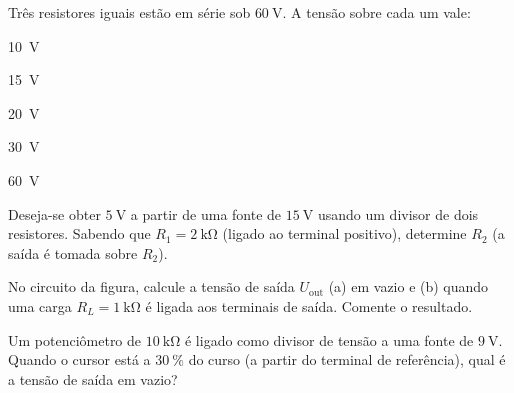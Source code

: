 \begin{questao}[1]{}

Três resistores iguais estão em série sob $\SI{60}{\volt}$. A tensão sobre cada um
vale:
\begin{alternativas}[3]
\item \SI{10}{\volt}
\item \SI{15}{\volt}
\item \SI{20}{\volt}
\item \SI{30}{\volt}
\item \SI{60}{\volt}
\end{alternativas}


\end{questao}

\blocoaplicacao
\begin{questao}[2]{}

Deseja-se obter $\SI{5}{\volt}$ a partir de uma fonte de $\SI{15}{\volt}$ usando
um divisor de dois resistores. Sabendo que $R_1 = \SI{2}{\kilo\ohm}$ (ligado ao
terminal positivo), determine $R_2$ (a saída é tomada sobre $R_2$).


\end{questao}
\begin{questao}[2]{}

No circuito da figura, calcule a tensão de saída $U_{\text{out}}$ (a) em vazio e
(b) quando uma carga $R_L = \SI{1}{\kilo\ohm}$ é ligada aos terminais de saída.
Comente o resultado.




\end{questao}
\begin{questao}[2]{}

Um potenciômetro de $\SI{10}{\kilo\ohm}$ é ligado como divisor de tensão a uma
fonte de $\SI{9}{\volt}$. Quando o cursor está a $\SI{30}{\percent}$ do curso (a
partir do terminal de referência), qual é a tensão de saída em vazio?


\end{questao}
